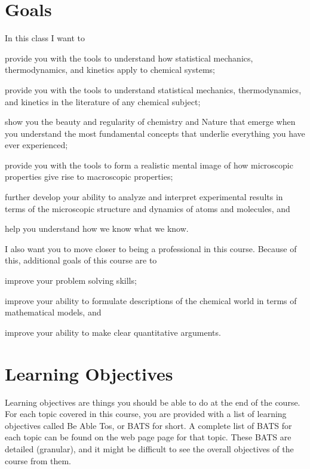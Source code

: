 \documentclass[letterpaper,oneside,onecolumn,11pt,article]{memoir}
\begin{document}
\section{Goals}
In this class I want to
\begin{inparaenum}
\item provide you with the tools to understand how statistical mechanics, thermodynamics, and kinetics apply to chemical systems;
\item provide you with the tools to understand statistical mechanics, thermodynamics, and kinetics in the literature of any chemical subject;
\item show you the beauty and regularity of chemistry and Nature that emerge when you understand the most fundamental concepts that underlie everything you have ever experienced;
\item provide you with the tools to form a realistic mental image of how microscopic properties give rise to macroscopic properties;
\item further develop your ability to analyze and interpret experimental results in terms of the microscopic structure and dynamics of atoms and molecules, and 
\item help you understand how we know what we know.
\end{inparaenum}

I also want you to move closer to being a professional in this course. Because of this, additional goals of this course are to
\begin{inparaenum}
\item improve your problem solving skills;
\item improve your ability to formulate descriptions of the chemical world in terms of mathematical models, and
\item improve your ability to make clear quantitative arguments.
\end{inparaenum}
%
%
\section{Learning Objectives}
Learning objectives are things you should be able to do at the end of the course. For each topic covered in this course, you are provided with a list of learning objectives called Be Able Tos, or BATS for short. A complete list of BATS for each topic can be found on the web page page for that topic. These BATS are detailed (granular), and it might be difficult to see the overall objectives of the course from them.
\end{document}

